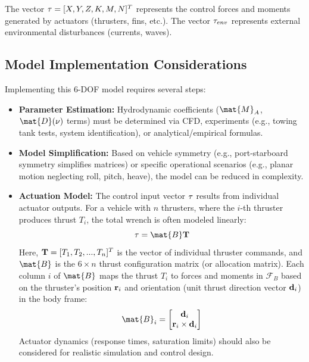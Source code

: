 The vector $\mathbf{\tau} = [X, Y, Z, K, M, N]^T$ represents the control forces and moments generated by actuators (thrusters, fins, etc.). The vector $\mathbf{\tau}_{env}$ represents external environmental disturbances (currents, waves).

\subsection{Model Implementation Considerations}
Implementing this 6-DOF model requires several steps:
\begin{itemize}
    \item \textbf{Parameter Estimation:} Hydrodynamic coefficients ($\mat{M}_A$, $\mat{D}(\vect{\nu})$ terms) must be determined via CFD, experiments (e.g., towing tank tests, system identification), or analytical/empirical formulas.
    \item \textbf{Model Simplification:} Based on vehicle symmetry (e.g., port-starboard symmetry simplifies matrices) or specific operational scenarios (e.g., planar motion neglecting roll, pitch, heave), the model can be reduced in complexity.
    \item \textbf{Actuation Model:} The control input vector $\mathbf{\tau}$ results from individual actuator outputs. For a vehicle with $n$ thrusters, where the $i$-th thruster produces thrust $T_i$, the total wrench is often modeled linearly:
    \begin{equation}
        \vect{\tau} = \mat{B} \vect{T}
    \end{equation}
    Here, $\mathbf{T} = [T_1, T_2, ..., T_n]^T$ is the vector of individual thruster commands, and $\mat{B}$ is the $6 \times n$ thrust configuration matrix (or allocation matrix). Each column $i$ of $\mat{B}$ maps the thrust $T_i$ to forces and moments in $\mathcal{F}_B$ based on the thruster's position $\mathbf{r}_i$ and orientation (unit thrust direction vector $\mathbf{d}_i$) in the body frame:
    \begin{equation}
        \mat{B}_i = \begin{bmatrix} \vect{d}_i \\ \vect{r}_i \times \vect{d}_i \end{bmatrix}
    \end{equation}
    Actuator dynamics (response times, saturation limits) should also be considered for realistic simulation and control design.
\end{itemize}

